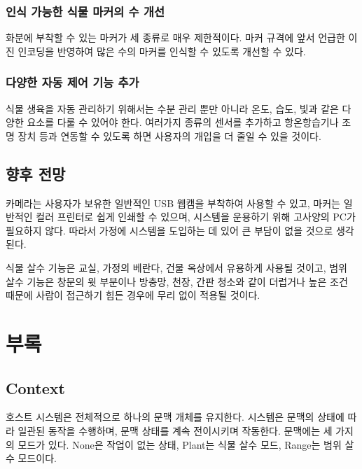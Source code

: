 \documentclass[chapter,11pt,oneside,openany]{xoblivoir}
\begin{document}
\subsection{인식 가능한 식물 마커의 수 개선}
화분에 부착할 수 있는 마커가 세 종류로 매우 제한적이다.
마커 규격에 앞서 언급한 이진 인코딩을 반영하여 많은 수의 마커를 인식할 수 있도록 개선할 수 있다.

\subsection{다양한 자동 제어 기능 추가}
식물 생육을 자동 관리하기 위해서는 수분 관리 뿐만 아니라 온도, 습도, 빛과 같은 다양한 요소를
다룰 수 있어야 한다. 여러가지 종류의 센서를 추가하고 항온항습기나 조명 장치 등과 연동할 수 있도록 하면
사용자의 개입을 더 줄일 수 있을 것이다.

\section{향후 전망}
카메라는 사용자가 보유한 일반적인 USB 웹캠을 부착하여 사용할 수 있고,
마커는 일반적인 컬러 프린터로 쉽게 인쇄할 수 있으며,
시스템을 운용하기 위해 고사양의 PC가 필요하지 않다.
따라서 가정에 시스템을 도입하는 데 있어 큰 부담이 없을 것으로 생각된다.

식물 살수 기능은 교실, 가정의 베란다, 건물 옥상에서 유용하게 사용될 것이고,
범위 살수 기능은 창문의 윗 부분이나 방충망, 천장, 간판 청소와 같이
더럽거나 높은 조건 때문에 사람이 접근하기 힘든 경우에 무리 없이 적용될 것이다.





\chapter{부록}
\label{appendixHost}

\appendix

\section{Context}
호스트 시스템은 전체적으로 하나의 문맥 개체를 유지한다.
시스템은 문맥의 상태에 따라 일관된 동작을 수행하며, 문맥 상태를 계속 전이시키며 작동한다. 문맥에는 세 가지의 모드가 있다. None은 작업이 없는 상태,
Plant는 식물 살수 모드, Range는 범위 살수 모드이다.
\end{document}
